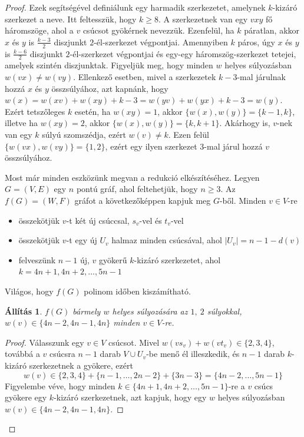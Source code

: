 \documentclass[12pt, a4paper]{report}
\newtheorem{áll}[tét]{Állítás}
\theoremstyle{remark}
\theoremstyle{definition}
\begin{document}
\begin{proof}
Ezek segítségével definiálunk egy harmadik szerkezetet, amelynek $k$-kizáró szerkezet a neve. Itt feltesszük, hogy $k \geq 8$. A szerkezetnek van egy $vxy$ fő háromszöge, ahol a $v$ csúcsot gyökérnek nevezzük. Ezenfelül, ha $k$ páratlan, akkor $x$ és $y$ is $\frac{k - 3}{2}$ diszjunkt $2$-él-szerkezet végpontjai. Amennyiben $k$ páros, úgy $x$ és $y$ is $\frac{k - 6}{2}$ diszjunkt $2$-él-szerkezet végpontjai és egy-egy háromszög-szerkezet tetejei, amelyek szintén diszjunktak. Figyeljük meg, hogy minden $w$ helyes súlyozásban $w(vx) \neq w(vy)$. Ellenkező esetben, mivel a szerkezetek $k - 3$-mal járulnak hozzá $x$ és $y$ összsúlyához, azt kapnánk, hogy $w(x) = w(xv) + w(xy) + k - 3 = w(yv) + w(yx) + k - 3 = w(y)$. Ezért tetszőleges $k$ esetén, ha $w(xy) = 1$, akkor $\lbrace w(x), w(y) \rbrace = \lbrace k - 1, k \rbrace$, illetve ha $w(xy) = 2$, akkor $\lbrace w(x), w(y) \rbrace = \lbrace k, k + 1 \rbrace$. Akárhogy is, $v$-nek van egy $k$ súlyú szomszédja, ezért $w(v) \neq k$. Ezen felül $\lbrace w(vx), w(vy) \rbrace = \lbrace 1, 2 \rbrace$, ezért egy ilyen szerkezet $3$-mal járul hozzá $v$ összsúlyához.

Most már minden eszközünk megvan a redukció elkészítéséhez. Legyen $G = (V, E)$ egy $n$ pontú gráf, ahol feltehetjük, hogy $n \geq 3$. Az $f(G) = (W, F)$ gráfot a következőképpen kapjuk meg $G$-ből. Minden $v \in V$-re
\begin{itemize}
\item összekötjük $v$-t két új csúccsal, $s_v$-vel és $t_v$-vel
\item összekötjük $v$-t egy új $U_v$ halmaz minden csúcsával, ahol $|U_v| = n - 1 - d(v)$
\item felveszünk $n - 1$ új, $v$ gyökerű $k$-kizáró szerkezetet, ahol $k = 4n + 1, 4n + 2, \ldots, 5n - 1$
\end{itemize}

Világos, hogy $f(G)$ polinom időben kiszámítható.

\begin{áll} \label{pro:npreduct12}
$f(G)$ bármely $w$ helyes súlyozására az $1,\ 2$ súlyokkal, $w(v) \in \lbrace 4n - 2, 4n - 1, 4n \rbrace$ minden $v \in V$-re.
\end{áll}

\begin{proof}
Válasszunk egy $v \in V$ csúcsot. Mivel $w(vs_v) + w(vt_v) \in \lbrace 2, 3, 4 \rbrace$, továbbá a $v$ csúcsra $n - 1$ darab $V \cup U_v$-be menő él illeszkedik, és $n - 1$ darab $k$-kizáró szerkezetnek a gyökere, ezért
\begin{equation*}
w(v) \in \lbrace 2, 3, 4 \rbrace + \lbrace n - 1, \ldots, 2n - 2 \rbrace + \lbrace 3n - 3 \rbrace = \lbrace 4n - 2, \ldots, 5n - 1 \rbrace
\end{equation*}
Figyelembe véve, hogy minden $k \in \lbrace 4n + 1, 4n + 2, \ldots, 5n - 1 \rbrace$-re a $v$ csúcs gyökere egy $k$-kizáró szerkezetnek, azt kapjuk, hogy egy $w$ helyes súlyozásban $w(v) \in \lbrace 4n - 2, 4n - 1, 4n \rbrace$.
\end{proof}


\end{proof}
\end{document}
